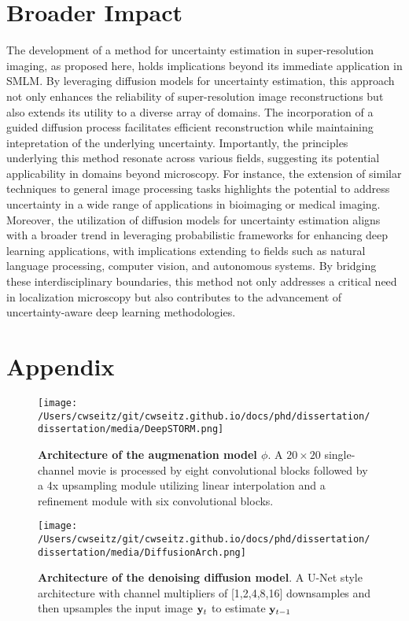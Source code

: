 \section{Broader Impact}

The development of a method for uncertainty estimation in super-resolution imaging, as proposed here, holds implications beyond its immediate application in SMLM. By leveraging diffusion models for uncertainty estimation, this approach not only enhances the reliability of super-resolution image reconstructions but also extends its utility to a diverse array of domains. The incorporation of a guided diffusion process facilitates efficient reconstruction while maintaining intepretation of the underlying uncertainty. Importantly, the principles underlying this method resonate across various fields, suggesting its potential applicability in domains beyond microscopy. For instance, the extension of similar techniques to general image processing tasks highlights the potential to address uncertainty in a wide range of applications in bioimaging or medical imaging. Moreover, the utilization of diffusion models for uncertainty estimation aligns with a broader trend in leveraging probabilistic frameworks for enhancing deep learning applications, with implications extending to fields such as natural language processing, computer vision, and autonomous systems. By bridging these interdisciplinary boundaries, this method not only addresses a critical need in localization microscopy but also contributes to the advancement of uncertainty-aware deep learning methodologies.


\section{Appendix}

\begin{figure}[t]
\centering
\texttt{[image: /Users/cwseitz/git/cwseitz.github.io/docs/phd/dissertation/dissertation/media/DeepSTORM.png]}
\caption{\textbf{Architecture of the augmenation model $\phi$}. A $20\times 20$ single-channel movie is processed by eight convolutional blocks followed by a 4x upsampling module utilizing linear interpolation and a refinement module with six convolutional blocks.}
\end{figure}


\begin{figure}[t]
\centering
\texttt{[image: /Users/cwseitz/git/cwseitz.github.io/docs/phd/dissertation/dissertation/media/DiffusionArch.png]}
\caption{\textbf{Architecture of the denoising diffusion model}. A U-Net style architecture with channel multipliers of [1,2,4,8,16] downsamples and then upsamples the input image $\bold{y}_{t}$ to estimate $\bold{y}_{t-1}$}
\end{figure}

